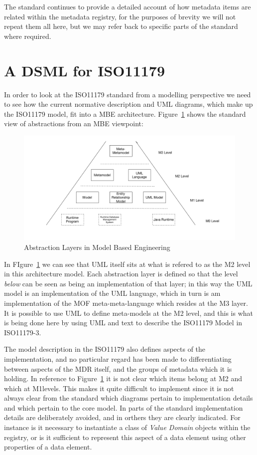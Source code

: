 \documentclass{llncs}
\begin{document}
The standard continues to provide a detailed account of how metadata items are related within the metadata registry, for the purposes of brevity we will not repeat them all here, but we may refer back to specific parts of the standard where required.


\section{A DSML for ISO11179}

In order to look at the ISO11179 standard from a modelling perspective we need to see how the current normative description and UML diagrams, which make up the ISO11179 model, fit into a MBE architecture. Figure~\ref{fig:mbe1} shows the standard view of abstractions from an MBE viewpoint:

\begin{figure}[h]
\includegraphics[width=1.0\textwidth,natwidth=610,natheight=642]{Models1}
\caption{Abstraction Layers in Model Based Engineering} 
\label{fig:mbe1}
\end{figure}

In FIgure~\ref{fig:mbe1}  we can see that UML itself sits at what is refered to as the M2 level in this architecture model. Each abstraction layer is defined so that the level \emph{below} can be seen as being an implementation of that layer; in this way the UML model is an implementation of the UML language, which in turn is am implementation of the MOF meta-meta-language which resides at the M3 layer. It is possible to use UML to define meta-models at the M2 level, and this is what is being done here by using UML and text to describe the ISO11179 Model in ISO11179-3. 

The model description in the ISO11179 also defines aspects of the implementation, and no particular regard has been made to differentiating between aspects of the MDR itself, and the groups of metadata which it is holding. In reference to Figure~\ref{fig:mbe1} it is not clear which items belong at M2 and which at M1levels. This makes it quite difficult to implement since it is not always clear from the standard which diagrams pertain to implementation details and which pertain to the core model. In parts of the standard implementation details are deliberately avoided, and in orthers they are clearly indicated. For instance is it necessary to instantiate a class of \emph{Value Domain} objects within the registry, or is it sufficient to represent this aspect of a data element using other properties of a data element.
\end{document}
